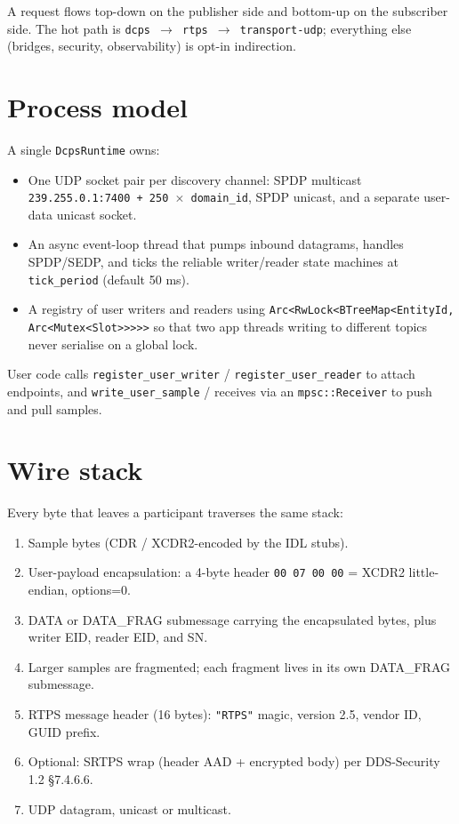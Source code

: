 \documentclass[11pt,a4paper]{article}
\begin{document}
A request flows top-down on the publisher side and bottom-up on
the subscriber side. The hot path is
\texttt{dcps $\rightarrow$ rtps $\rightarrow$ transport-udp};
everything else (bridges, security, observability) is opt-in
indirection.

\section{Process model}

A single \texttt{DcpsRuntime} owns:

\begin{itemize}[leftmargin=*]
  \item One UDP socket pair per discovery channel: SPDP multicast
        \texttt{239.255.0.1:7400 + 250 $\times$ domain\_id},
        SPDP unicast, and a separate user-data unicast socket.
  \item An async event-loop thread that pumps inbound datagrams,
        handles SPDP/SEDP, and ticks the reliable writer/reader
        state machines at \texttt{tick\_period} (default 50 ms).
  \item A registry of user writers and readers using
        \texttt{Arc<RwLock<BTreeMap<EntityId, Arc<Mutex<Slot>>>>>} so
        that two app threads writing to different topics never
        serialise on a global lock.
\end{itemize}

User code calls \texttt{register\_user\_writer} /
\texttt{register\_user\_reader} to attach endpoints, and
\texttt{write\_user\_sample} / receives via an
\texttt{mpsc::Receiver} to push and pull samples.

\section{Wire stack}

Every byte that leaves a participant traverses the same stack:

\begin{enumerate}[leftmargin=*]
  \item Sample bytes (CDR / XCDR2-encoded by the IDL stubs).
  \item User-payload encapsulation: a 4-byte header
        \texttt{00 07 00 00} = XCDR2 little-endian, options=0.
  \item DATA or DATA\_FRAG submessage carrying the encapsulated
        bytes, plus writer EID, reader EID, and SN.
  \item Larger samples are fragmented; each fragment lives in its
        own DATA\_FRAG submessage.
  \item RTPS message header (16 bytes): \texttt{"RTPS"} magic,
        version 2.5, vendor ID, GUID prefix.
  \item Optional: SRTPS wrap (header AAD + encrypted body) per
        DDS-Security 1.2 §7.4.6.6.
  \item UDP datagram, unicast or multicast.
\end{enumerate}
\end{document}
